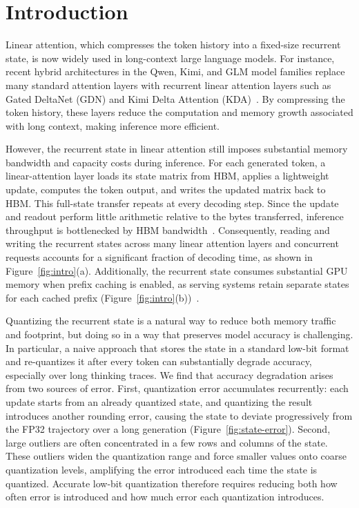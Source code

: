 \section{Introduction}\label{sec:introduction}

Linear attention, which compresses the token history into a fixed-size recurrent state, is now widely used in long-context large language models.
For instance, recent hybrid architectures in the Qwen, Kimi, and GLM model families replace many standard attention layers with recurrent linear attention layers such as Gated DeltaNet (GDN) and Kimi Delta Attention (KDA)~\citep{qwen2025qwen3next,yang2025gated,team2025kimi}.
By compressing the token history, these layers reduce the computation and memory growth associated with long context, making inference more efficient.

However, the recurrent state in linear attention still imposes substantial memory bandwidth and capacity costs during inference.
For each generated token, a linear-attention layer loads its state matrix from HBM, applies a lightweight update, computes the token output, and writes the updated matrix back to HBM.
This full-state transfer repeats at every decoding step.
Since the update and readout perform little arithmetic relative to the bytes transferred, inference throughput is bottlenecked by HBM bandwidth~\citep{williams2009roofline}.
Consequently, reading and writing the recurrent states across many linear attention layers and concurrent requests accounts for a significant fraction of decoding time, as shown in Figure~\ref{fig:intro}(a).
Additionally, the recurrent state consumes substantial GPU memory when prefix caching is enabled, as serving systems retain separate states for each cached prefix (Figure~\ref{fig:intro}(b))~\citep{pan2025marconi}.


Quantizing the recurrent state is a natural way to reduce both memory traffic and footprint, but doing so in a way that preserves model accuracy is challenging.
In particular, a naive approach that stores the state in a standard low-bit format and re-quantizes it after every token can substantially degrade accuracy, especially over long thinking traces.
We find that accuracy degradation arises from two sources of error.
First, quantization error accumulates recurrently: each update starts from an already quantized state, and quantizing the result introduces another rounding error, causing the state to deviate progressively from the FP32 trajectory over a long generation (Figure~\ref{fig:state-error}).
Second, large outliers are often concentrated in a few rows and columns of the state.
These outliers widen the quantization range and force smaller values onto coarse quantization levels, amplifying the error introduced each time the state is quantized.
Accurate low-bit quantization therefore requires reducing both how often error is introduced and how much error each quantization introduces.

